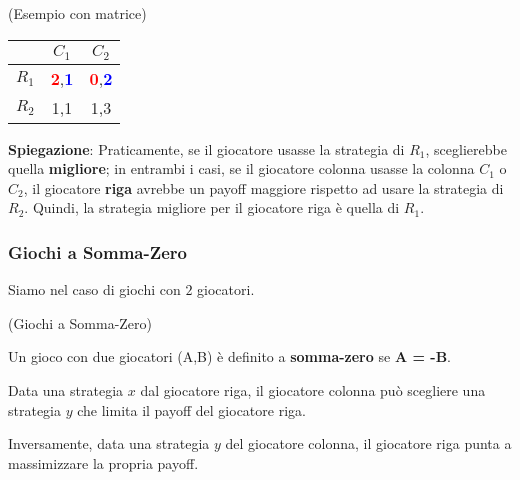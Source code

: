 \begin{esempio}(Esempio con matrice)
\end{esempio}

\renewcommand{\arraystretch}{2}

\begin{table}[H]
    \begin{center}
        \begin{tabular}{|c|c|c|}
            \hline
                  & $C_1$                                                    & $C_2$                                                    \\
            \hline
            $R_1$ & \textcolor{red}{\textbf{2}},\textcolor{blue}{\textbf{1}} & \textcolor{red}{\textbf{0}},\textcolor{blue}{\textbf{2}} \\
            \hline
            $R_2$ & 1,1                                                      & 1,3                                                      \\
            \hline
        \end{tabular}
    \end{center}
\end{table}

\textbf{Spiegazione}: Praticamente, se il giocatore usasse la strategia di $R_1$,
sceglierebbe quella \textbf{migliore}; in entrambi i casi, se il giocatore colonna usasse la colonna $C_1$ o $C_2$, il giocatore \textbf{riga} avrebbe un payoff maggiore rispetto ad usare la strategia di $R_2$. Quindi, la strategia migliore per il giocatore riga è quella di $R_1$.

\subsubsection{Giochi a Somma-Zero}

Siamo nel caso di giochi con $2$ giocatori.
\begin{definition}(Giochi a Somma-Zero)

    Un gioco con due giocatori (A,B) è definito a \textbf{somma-zero} se \textbf{A
        = -B}.

    Data una strategia $x$ dal giocatore riga, il giocatore colonna può scegliere
    una strategia $y$ che limita il payoff del giocatore riga.

    Inversamente, data una strategia $y$ del giocatore colonna, il giocatore riga
    punta a massimizzare la propria payoff.
\end{definition}

